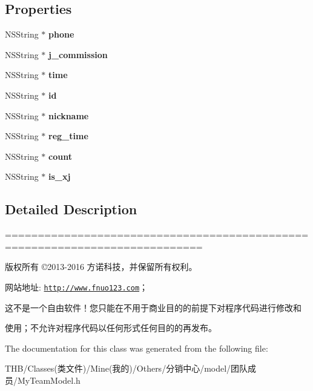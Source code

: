 \subsection*{Properties}
\begin{DoxyCompactItemize}
\item 
\mbox{\label{interface_my_team_model_a04ca134107dad57f8aa501ad24ce6368}} 
N\+S\+String $\ast$ {\bfseries phone}
\item 
\mbox{\label{interface_my_team_model_af18be608195e6367876922809a3dbba7}} 
N\+S\+String $\ast$ {\bfseries j\+\_\+commission}
\item 
\mbox{\label{interface_my_team_model_ab2c021146f3e1fb169e4fb6909a0ed3a}} 
N\+S\+String $\ast$ {\bfseries time}
\item 
\mbox{\label{interface_my_team_model_a30faee97b4b457bb98ed11cecd9dc188}} 
N\+S\+String $\ast$ {\bfseries id}
\item 
\mbox{\label{interface_my_team_model_a93e834fc66ee09cccf11ef447f723b87}} 
N\+S\+String $\ast$ {\bfseries nickname}
\item 
\mbox{\label{interface_my_team_model_a624fab74a0fc3f6760f6fe3c0cac55b8}} 
N\+S\+String $\ast$ {\bfseries reg\+\_\+time}
\item 
\mbox{\label{interface_my_team_model_adb19681b228cd54324b8116d2b529d73}} 
N\+S\+String $\ast$ {\bfseries count}
\item 
\mbox{\label{interface_my_team_model_a3e27edf02c2d2b7085a751977a37100f}} 
N\+S\+String $\ast$ {\bfseries is\+\_\+xj}
\end{DoxyCompactItemize}


\subsection{Detailed Description}
============================================================================

版权所有 ©2013-\/2016 方诺科技，并保留所有权利。

网站地址\+: \href{http://www.fnuo123.com}{\tt http\+://www.\+fnuo123.\+com}； 



这不是一个自由软件！您只能在不用于商业目的的前提下对程序代码进行修改和

使用；不允许对程序代码以任何形式任何目的的再发布。 

 

The documentation for this class was generated from the following file\+:\begin{DoxyCompactItemize}
\item 
T\+H\+B/\+Classes(类文件)/\+Mine(我的)/\+Others/分销中心/model/团队成员/My\+Team\+Model.\+h\end{DoxyCompactItemize}
